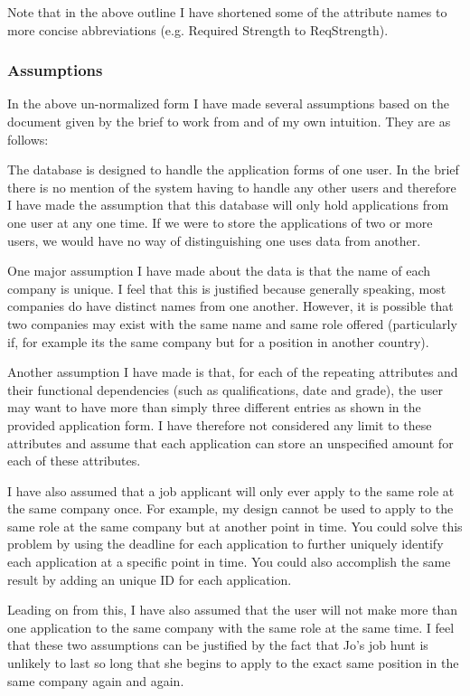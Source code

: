 \documentclass{article}
\begin{document}
Note that in the above outline I have shortened some of the attribute names to more concise abbreviations (e.g. Required Strength to ReqStrength).

\subsubsection{Assumptions}

In the above un-normalized form I have made several assumptions based on the document given by the brief to work from and of my own intuition. They are as follows:

The database is designed to handle the application forms of one user. In the brief there is no mention of the system having to handle any other users and therefore I have made the assumption that this database will only hold applications from one user at any one time. If we were to store the applications of two or more users, we would have no way of distinguishing one uses data from another.

One major assumption I have made about the data is that the name of each company is unique. I feel that this is justified because generally speaking, most companies do have distinct names from one another. However, it is possible that two companies may exist with the same name and same role offered (particularly if, for example its the same company but for a position in another country).

Another assumption I have made is that, for each of the repeating attributes and their functional dependencies (such as qualifications, date and grade), the user may want to have more than simply three different entries as shown in the provided application form. I have therefore not considered any limit to these attributes and assume that each application can store an unspecified amount for each of these attributes.

I have also assumed that a job applicant will only ever apply to the same role at the same company once. For example, my design cannot be used to apply to the same role at the same company but at another point in time. You could solve this problem by using the deadline for each application to further uniquely identify each application at a specific point in time. You could also accomplish the same result by adding an unique ID for each application.

Leading on from this, I have also assumed that the user will not make more than one application to the same company with the same role at the same time. I feel that these two assumptions can be justified by the fact that Jo's job hunt is unlikely to last so long that she begins to apply to the exact same position in the same company again and again.
\end{document}
